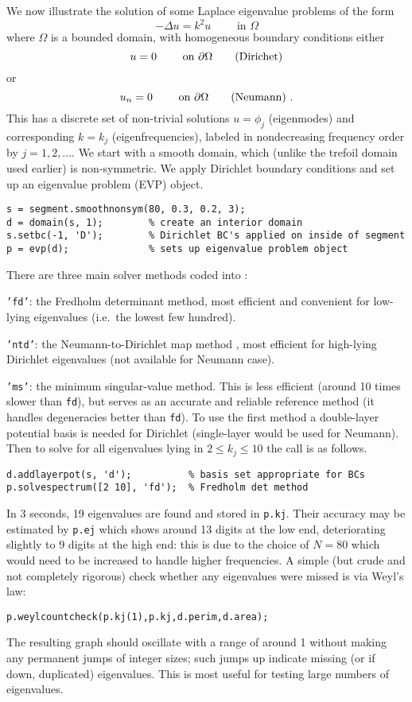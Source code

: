 We now illustrate the solution of some Laplace eigenvalue problems
of the form
$$
-\Delta u = k^2 u    \qquad \mbox{ in } \Omega
$$
where $\Omega$ is a bounded domain,
with homogeneous boundary conditions either
$$
u = 0 \qquad \mbox{ on } {\partial\Omega}   \qquad \mbox{(Dirichet)}
$$
or
$$
u_n = 0 \qquad \mbox{ on } {\partial\Omega}   \qquad \mbox{(Neumann)} ~.
$$
This has a discrete set of non-trivial solutions $u=\phi_j$ (eigenmodes) and corresponding $k=k_j$ (eigenfrequencies), labeled in nondecreasing
frequency order by $j=1,2,\ldots$.
We start with a smooth domain, which (unlike the trefoil domain
used earlier) is non-symmetric. We apply Dirichlet boundary conditions
and set up an eigenvalue problem (EVP) object.
\begin{verbatim}
s = segment.smoothnonsym(80, 0.3, 0.2, 3);
d = domain(s, 1);        % create an interior domain
s.setbc(-1, 'D');        % Dirichlet BC's applied on inside of segment
p = evp(d);              % sets up eigenvalue problem object
\end{verbatim}
There are three main solver methods coded into \mpspack:
\bi
\item {\tt 'fd'}: the Fredholm determinant method, most efficient and convenient for low-lying
eigenvalues (i.e.\ the lowest few hundred).
\item  {\tt 'ntd'}: the Neumann-to-Dirichlet map method \cite{sca}, most efficient
for high-lying Dirichlet eigenvalues (not available for Neumann case).
\item {\tt 'ms'}: the minimum singular-value method. This is less efficient
(around 10 times slower than {\tt fd}),
but serves as an accurate and reliable reference method (it handles
degeneracies better than {\tt fd}).
\ei
To use the first method a double-layer potential basis is needed
for Dirichlet (single-layer would be used for Neumann).
Then to solve for all eigenvalues lying in $2\le k_j \le 10$ the call
is as follows.
\begin{verbatim}
d.addlayerpot(s, 'd');          % basis set appropriate for BCs
p.solvespectrum([2 10], 'fd');  % Fredholm det method
\end{verbatim}
In 3 seconds, 19 eigenvalues are found and stored in {\tt p.kj}.
Their accuracy may be estimated by {\tt p.ej} which shows
around 13 digits at the low end, deteriorating slightly to 9 digits
at the high end: this is due to the choice of $N=80$ which would need
to be increased to handle higher frequencies.
A simple (but crude and not completely rigorous) check whether any eigenvalues were missed is via Weyl's law:
\begin{verbatim}
p.weylcountcheck(p.kj(1),p.kj,d.perim,d.area);
\end{verbatim}
The resulting graph should oscillate with a range of around 1
without making any permanent
jumps of integer sizes; such jumps up indicate missing (or if down, duplicated)
eigenvalues.
This is most useful for testing large numbers of eigenvalues.


